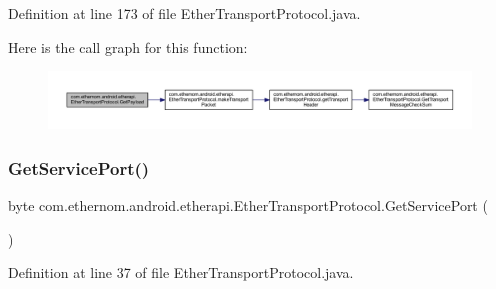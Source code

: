 Definition at line 173 of file Ether\+Transport\+Protocol.\+java.

Here is the call graph for this function\+:\nopagebreak
\begin{figure}[H]
\begin{center}
\leavevmode
\includegraphics[width=350pt]{classcom_1_1ethernom_1_1android_1_1etherapi_1_1_ether_transport_protocol_ab057f7bccb0c2bef005a657cc3eef13d_cgraph}
\end{center}
\end{figure}
\mbox{\label{classcom_1_1ethernom_1_1android_1_1etherapi_1_1_ether_transport_protocol_ae590c234c12d110212fd75595235a132}} 
\subsubsection{\texorpdfstring{Get\+Service\+Port()}{GetServicePort()}}
{\footnotesize\ttfamily byte com.\+ethernom.\+android.\+etherapi.\+Ether\+Transport\+Protocol.\+Get\+Service\+Port (\begin{DoxyParamCaption}{ }\end{DoxyParamCaption})}



Definition at line 37 of file Ether\+Transport\+Protocol.\+java.

